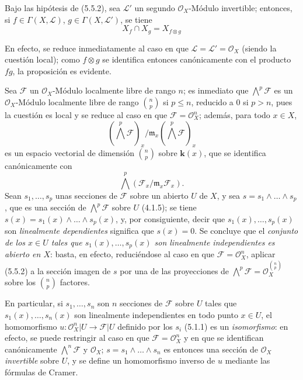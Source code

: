 \begin{env}[5.5.3]
\label{0.5.5.3-fr}
Bajo las hipótesis de (5.5.2), sea $\mathcal{L}'$ un segundo
$\mathcal{O}_X$-Módulo invertible; entonces, si
$f\in\Gamma(X,\mathcal{L})$, $g\in\Gamma(X,\mathcal{L}')$, se tiene
\[
  X_f\cap X_g=X_{f\otimes g}
\]

En efecto, se reduce inmediatamente al caso en que
$\mathcal{L}=\mathcal{L}'=\mathcal{O}_X$ (siendo la cuestión local); como
$f\otimes g$ se identifica entonces canónicamente con el producto $fg$, la proposición
es evidente.
\end{env}


\begin{env}[5.5.4]
\label{0.5.5.4-fr}
Sea $\mathcal{F}$ un $\mathcal{O}_X$-Módulo localmente libre de rango $n$;
es inmediato que $\bigwedge^p\mathcal{F}$ es un $\mathcal{O}_X$-Módulo
localmente libre de rango $\binom{n}{p}$ si $p\leq n$, reducido a $0$ si $p>n$,
pues la cuestión es local y se reduce al caso en que
$\mathcal{F}=\mathcal{O}_X^n$; además, para todo $x\in X$,
\[
  (\bigwedge^p\mathcal{F})_x/
  \mathfrak{m}_x(\bigwedge^p\mathcal{F})_x
\]
es un espacio vectorial de dimensión $\binom{n}{p}$ sobre $\boldsymbol{k}(x)$, que
se identifica canónicamente con
\[
  \bigwedge^p(\mathcal{F}_x/\mathfrak{m}_x\mathcal{F}_x).
\]
Sean
$s_1,\ldots,s_p$ unas secciones de $\mathcal{F}$ sobre un abierto $U$ de $X$, y
sea $s=s_1\wedge\ldots\wedge s_p$, que es una sección de
$\bigwedge^p\mathcal{F}$ sobre $U$ (4.1.5); se tiene
$s(x)=s_1(x)\wedge\ldots\wedge s_p(x)$, y, por consiguiente, decir que
$s_1(x),\ldots,s_p(x)$ son \emph{linealmente dependientes} significa que
$s(x)=0$. Se concluye que el \emph{conjunto de los $x\in U$ tales que
$s_1(x),\ldots,s_p(x)$ son linealmente independientes es abierto en
$X$}: basta, en efecto, reduciéndose al caso en que
$\mathcal{F}=\mathcal{O}_X^n$, aplicar (5.5.2) a la sección imagen de $s$
por una de las proyecciones de
$\bigwedge^p\mathcal{F}=\mathcal{O}_X^{\binom{n}{p}}$ sobre los
$\binom{n}{p}$ factores.

En particular, si $s_1,\ldots,s_n$ son $n$ secciones de $\mathcal{F}$
sobre $U$ tales que $s_1(x),\ldots,s_n(x)$ son linealmente
independientes en todo punto $x\in U$, el homomorfismo
$u:\mathcal{O}_X^n|U\to\mathcal{F}|U$ definido por los $s_i$ (5.1.1) es un
\emph{isomorfismo}: en efecto, se puede restringir al caso en que
$\mathcal{F}=\mathcal{O}_X^n$ y en que se identifican canónicamente
$\bigwedge^n\mathcal{F}$ y $\mathcal{O}_X$;
$s=s_1\wedge\ldots\wedge s_n$ es entonces una sección de $\mathcal{O}_X$
\emph{invertible} sobre $U$, y se define un homomorfismo inverso
de $u$ mediante las fórmulas de Cramer.
\end{env}


